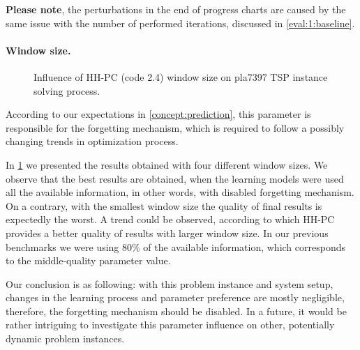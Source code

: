 \textbf{Please note}, the perturbations in the end of progress charts are caused by the same issue with the number of performed iterations, discussed in \cref{eval:1:baseline}.

\paragraph{Window size.}
\begin{figure}[h]
	\centering
	\vspace{-20pt}
	
	\caption{Influence of HH-PC (code 2.4) window size on pla7397 TSP instance solving process.}
	\vspace{-5pt}
	\label{eval:2:pict:window size}
\end{figure}
According to our expectations in \cref{concept:prediction}, this parameter is responsible for the forgetting mechanism, which is required to follow a possibly changing trends in optimization process.

In \cref{eval:2:pict:window size} we presented the results obtained with four different window sizes. We observe that the best results are obtained, when the learning models were used all the available information, in other words, with disabled forgetting mechanism. On a contrary, with the smallest window size the quality of final results is expectedly the worst. A trend could be observed, according to which HH-PC provides a better quality of results with larger window size. In our previous benchmarks we were using 80\% of the available information, which corresponds to the middle-quality parameter value.

Our conclusion is as following: with this problem instance and system setup, changes in the learning process and parameter preference are mostly negligible, therefore, the forgetting mechanism should be disabled. In a future, it would be rather intriguing to investigate this parameter influence on other, potentially dynamic problem instances.

